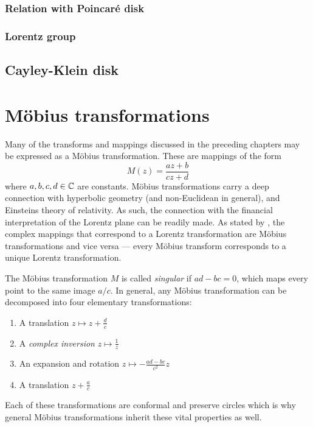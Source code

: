 \subsubsection{Relation with Poincaré disk}

\subsubsection{Lorentz group}

\subsection{Cayley-Klein disk}

\section{Möbius transformations}
\label{sec:mobius}
Many of the transforms and mappings discussed in the preceding chapters may be expressed as a Möbius transformation. These are mappings of the form \cite{Needham1997}
\begin{equation}
    M(z) = \frac{az + b}{cz + d}
    \label{eq:mobius}
\end{equation}
where \(a, b, c, d \in \mathbb{C} \) are constants. Möbius transformations carry a deep connection with hyperbolic geometry (and non-Euclidean in general), and Einsteins theory of relativity. As such, the connection with the financial interpretation of the Lorentz plane can be readily made. As stated by \citet{Needham1997}, the complex mappings that correspond to a Lorentz transformation are Möbius transformations and vice versa --- every Möbius transform corresponds to a unique Lorentz transformation.

The Möbius transformation \(M\) is called \emph{singular} if \(ad - bc = 0\), which maps every point to the same image \(a/c\). In general, any Möbius transformation can be decomposed into four elementary transformations:
\begin{enumerate}
    \item A translation \(z \mapsto z + \frac{d}{c}\)
    \item A \emph{complex inversion} \(z \mapsto \frac{1}{z}\)
    \item An expansion and rotation \(z \mapsto -\frac{ad - bc}{c^2}z\)
    \item A translation \(z + \frac{a}{c}\)
\end{enumerate}
Each of these transformations are conformal and preserve circles which is why general Möbius transformations inherit these vital properties as well. 

